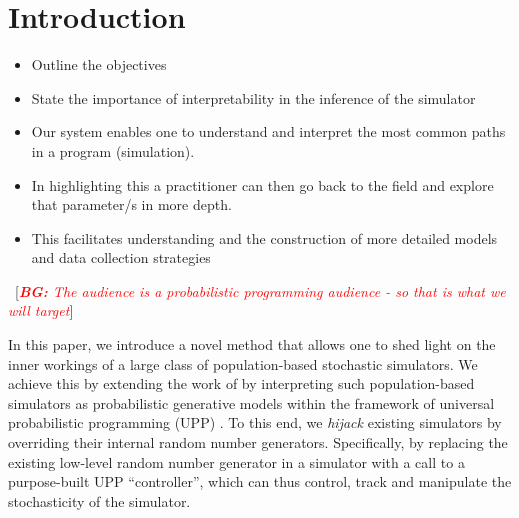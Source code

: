 \documentclass{article}
\newcommand{\bg}[1]{~{{[{\it \textcolor{red}{{\bf BG:} #1}}]}}}
\begin{document}
\begin{abstract}
\end{abstract}

\section{Introduction}


\begin{itemize}

\item Outline the objectives
\item State the importance of interpretability in the inference of the simulator
\item Our system enables one to understand and interpret the most common paths in a program (simulation).
\item In highlighting this a practitioner can then go back to the field and explore that parameter/s in more depth.
\item This facilitates understanding and the construction of more detailed models and data collection strategies


\end{itemize}

\bg{The audience is a probabilistic programming audience - so that is what we will target}

In this paper, we introduce a novel method that allows one to shed light on the inner workings of a large class of population-based stochastic simulators. We achieve this by extending the work of \citep{baydin2018efficient} by interpreting such population-based simulators as probabilistic generative models within the framework of universal probabilistic programming (UPP) \cite{le-2016-inference}. To this end, we \emph{hijack} existing simulators by overriding their internal random number generators.  Specifically, by replacing the existing low-level random number generator in a simulator with a call to a purpose-built UPP ``controller'', which can thus control, track and manipulate the stochasticity of the simulator.
\end{document}

